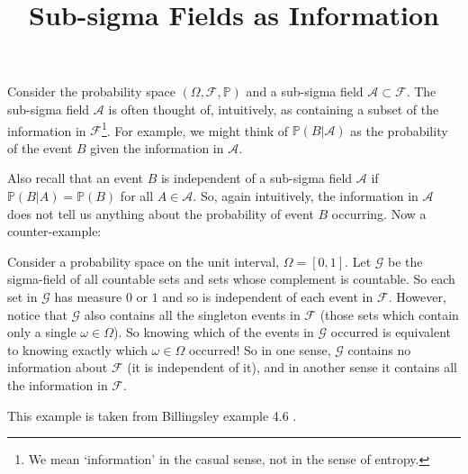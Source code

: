 \documentclass[12pt]{article}
\title{Sub-sigma Fields as Information}
\begin{document}
\maketitle

Consider the probability space $(\Omega, \mathcal{F}, \mathbb{P})$
and a sub-sigma field $\mathcal{A} \subset \mathcal{F}$.
The sub-sigma field $\mathcal{A}$ is often thought of,
intuitively, as containing a subset of the information in $\mathcal{F}$\footnote{We mean `information' in the casual sense, not in the sense of entropy.}. For example, we might think of $\mathbb{P}(B|\mathcal{A})$ as the probability of the event $B$ given the information in $\mathcal{A}$.

Also recall that an event $B$ is independent of a sub-sigma field $\mathcal{A}$ if $\mathbb{P}(B | A) = \mathbb{P}(B)$ for all $A \in \mathcal{A}$. So, again intuitively, the information in $\mathcal{A}$ does not tell us anything about the probability of event $B$ occurring. Now a counter-example:

Consider a probability space on the unit interval, $\Omega = [0, 1]$. Let $\mathcal{G}$ be the sigma-field of all countable sets and sets whose complement is countable. So each set in $\mathcal{G}$ has measure $0$ or $1$ and so is independent of each event in $\mathcal{F}$. However, notice that $\mathcal{G}$ also contains all the singleton events in $\mathcal{F}$ (those sets which contain only a single $\omega \in \Omega$). So knowing which of the events in $\mathcal{G}$ occurred is equivalent to knowing exactly which $\omega \in \Omega$ occurred! So in one sense, $\mathcal{G}$ contains no information about $\mathcal{F}$ (it is independent of it), and in another sense it contains all the information in $\mathcal{F}$.

This example is taken from Billingsley example 4.6 \cite{billingsley1995probability}.



\end{document}
